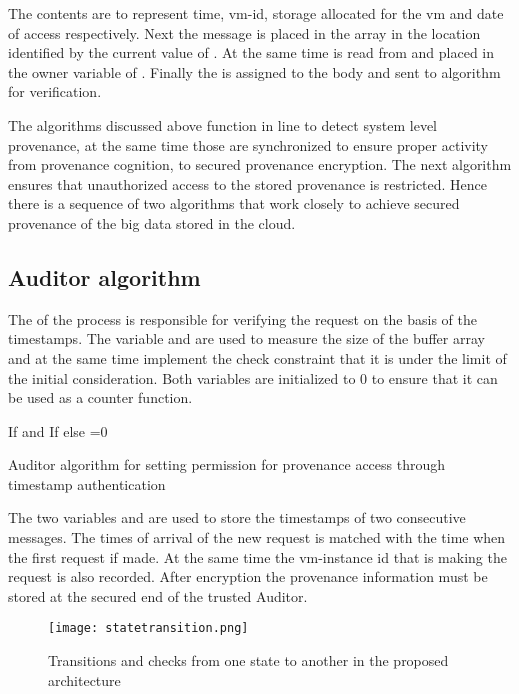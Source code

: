 \documentclass[conference]{IEEEtran}
\begin{document}
The contents are  to represent time, vm-id, storage allocated for the vm and date of access respectively. Next the message  is placed in the array  in the location identified by the current value of . At the same time  is read from  and placed in the owner variable of . Finally the  is assigned to the  body and sent to  algorithm for verification.

The algorithms discussed above function in line to detect system level provenance, at the same time those are synchronized to ensure proper activity from provenance cognition, to secured provenance encryption. The next algorithm ensures that unauthorized access to the stored provenance is restricted. Hence there is a sequence of two algorithms that work closely to achieve secured provenance of the big data stored in the cloud.



\subsection{Auditor algorithm}

The  of the process is responsible for verifying the request on the basis of the timestamps. The variable  and  are used to measure the size of the buffer array and at the same time implement the check constraint that it is under the limit of the initial consideration. Both variables are initialized to 0 to ensure that it can be used as a counter function.


\begin{algorithm}
 \begin{algorithmic}[1]
 \State 
 \State 
 \State 
 \State 
 \State 
\While {}
 \While {}
 \State 
 \State 
 \State 
\EndWhile
 \EndWhile
 \While {}
 \While {}
 \State 
 \State 
 \State If  and
 \State If 
 \State 
 \State else =0
 \EndWhile
 \EndWhile
\EndProcedure
 \end{algorithmic}
 \caption{Auditor algorithm for setting permission for provenance access through timestamp authentication}
 \label{euclid}
\end{algorithm}


The two variables  and  are used to store the timestamps of two consecutive messages. The times of arrival of the new request is matched with the time when the first request if made. At the same time the vm-instance id that is making the request is also recorded. After encryption the provenance information must be stored at the secured end of the trusted Auditor.
\begin{figure*}[t!]
\centering
\texttt{[image: statetransition.png]}
\caption{Transitions and checks from one state to another in the proposed architecture}
\label{figure4}
\end{figure*}
\end{document}
